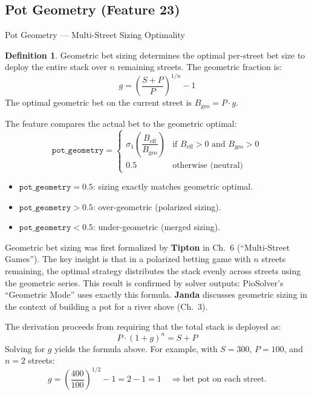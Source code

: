 \documentclass[11pt, a4paper]{article}
\theoremstyle{definition}
\newtheorem{definition}{Definition}[section]
\newcommand{\feature}[1]{\texttt{#1}}
\begin{document}
\subsection{Pot Geometry (Feature 23)}

\begin{featurebox}{Pot Geometry --- Multi-Street Sizing Optimality}
\begin{definition}
Geometric bet sizing determines the optimal per-street bet size to deploy the entire stack over $n$ remaining streets. The geometric fraction is:
\begin{equation}
    \boxed{g = \left(\frac{S + P}{P}\right)^{1/n} - 1}
\end{equation}
The optimal geometric bet on the current street is $B_{\text{geo}} = P \cdot g$.

The feature compares the actual bet to the geometric optimal:
\begin{equation}
    \feature{pot\_geometry} = \begin{cases}
        \sigma_1\!\left(\dfrac{B_{\text{eff}}}{B_{\text{geo}}}\right) & \text{if } B_{\text{eff}} > 0 \text{ and } B_{\text{geo}} > 0 \\[6pt]
        0.5 & \text{otherwise (neutral)}
    \end{cases}
\end{equation}

\begin{itemize}
    \item $\feature{pot\_geometry} = 0.5$: sizing exactly matches geometric optimal.
    \item $\feature{pot\_geometry} > 0.5$: over-geometric (polarized sizing).
    \item $\feature{pot\_geometry} < 0.5$: under-geometric (merged sizing).
\end{itemize}
\end{definition}
\end{featurebox}

\begin{refbox}
Geometric bet sizing was first formalized by \textbf{Tipton} \cite{tipton2019} in Ch.~6 (``Multi-Street Games''). The key insight is that in a polarized betting game with $n$ streets remaining, the optimal strategy distributes the stack evenly across streets using the geometric series. This result is confirmed by solver outputs: PioSolver's ``Geometric Mode'' uses exactly this formula. \textbf{Janda} \cite{janda2017} discusses geometric sizing in the context of building a pot for a river shove (Ch.~3).

The derivation proceeds from requiring that the total stack is deployed as:
\begin{equation}
    P \cdot (1 + g)^n = S + P
\end{equation}
Solving for $g$ yields the formula above. For example, with $S = 300$, $P = 100$, and $n = 2$ streets:
\[
    g = \left(\frac{400}{100}\right)^{1/2} - 1 = 2 - 1 = 1 \quad \Rightarrow \text{bet pot on each street.}
\]
\end{refbox}
\end{document}
